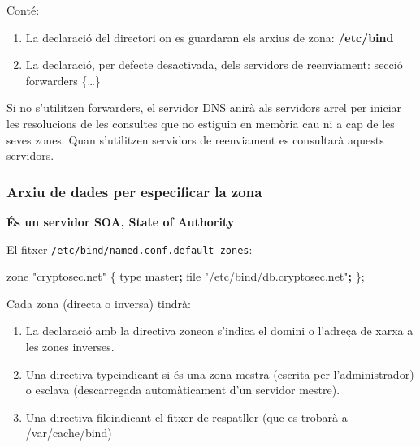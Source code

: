 \documentclass[]{article}
\newenvironment{Shaded}{}{}
\newcommand{\BuiltInTok}[1]{#1}
\newcommand{\ExtensionTok}[1]{#1}
\newcommand{\FunctionTok}[1]{\textcolor[rgb]{0.02,0.16,0.49}{#1}}
\newcommand{\KeywordTok}[1]{\textcolor[rgb]{0.00,0.44,0.13}{\textbf{#1}}}
\newcommand{\NormalTok}[1]{#1}
\newcommand{\StringTok}[1]{\textcolor[rgb]{0.25,0.44,0.63}{#1}}
\begin{document}
Conté:

\begin{enumerate}
\def\labelenumi{\arabic{enumi}.}
\item
  La declaració del directori on es guardaran els arxius de zona:
  \textbf{/etc/bind}
\item
  La declaració, per defecte desactivada, dels servidors de reenviament:
  secció forwarders \{\ldots{}\}
\end{enumerate}

Si no s'utilitzen forwarders, el servidor DNS anirà als servidors arrel
per iniciar les resolucions de les consultes que no estiguin en memòria
cau ni a cap de les seves zones. Quan s'utilitzen servidors de
reenviament es consultarà aquests servidors.

\hypertarget{arxiu-de-dades-per-especificar-la-zona}{%
\subsubsection{\texorpdfstring{\textbf{Arxiu de dades per especificar la
zona}}{Arxiu de dades per especificar la zona}}\label{arxiu-de-dades-per-especificar-la-zona}}

\textbf{És un servidor SOA, State of Authority}

El fitxer \texttt{/etc/bind/named.conf.default-zones}:

\begin{Shaded}
\begin{Highlighting}[]
\ExtensionTok{zone} \StringTok{"cryptosec.net"}\NormalTok{ \{}
        \BuiltInTok{type}\NormalTok{ master}\KeywordTok{;}
        \FunctionTok{file} \StringTok{"/etc/bind/db.cryptosec.net"}\KeywordTok{;}
\NormalTok{\};}
\end{Highlighting}
\end{Shaded}

Cada zona (directa o inversa) tindrà:

\begin{enumerate}
\def\labelenumi{\arabic{enumi}.}
\item
  La declaració amb la directiva zoneon s'indica el domini o l'adreça de
  xarxa a les zones inverses.
\item
  Una directiva typeindicant si és una zona mestra (escrita per
  l'administrador) o esclava (descarregada automàticament d'un servidor
  mestre).
\item
  Una directiva fileindicant el fitxer de respatller (que es trobarà a
  /var/cache/bind)
\end{enumerate}
\end{document}
